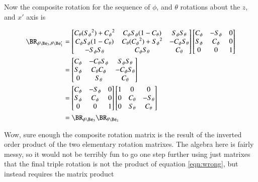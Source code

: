 \documentclass{article}
\begin{document}
Now the composite rotation for the sequence of $\phi$, and $\theta$ rotations about the $z$, and $x'$ axis is

\begin{align*}
\BR_{\phi \Be_3, \theta \Be_1'}
&=
\begin{bmatrix}
C_\theta({S_\phi}^2) + {C_\phi}^2 & {C_\phi} {S_\phi} (1-C_\theta) & {S_\phi} S_\theta \\
{C_\phi} {S_\phi} (1-C_\theta) & C_\theta({C_\phi}^2) + {S_\phi}^2 & - {C_\phi} S_\theta \\
- {S_\phi} S_\theta & {C_\phi} S_\theta & C_\theta \\
\end{bmatrix}
\begin{bmatrix}
C_\phi & - S_\phi & 0 \\
S_\phi & C_\phi & 0 \\
0 & 0 & 1 \\
\end{bmatrix} \\
&=
\begin{bmatrix}
C_\phi & -C_\theta S_\phi & {S_\phi} S_\theta \\
S_\phi & C_\theta C_\phi & - {C_\phi} S_\theta \\
0 & S_\theta & C_\theta \\
\end{bmatrix} \\
&=
\begin{bmatrix}
C_\phi & - S_\phi & 0 \\
S_\phi & C_\phi & 0 \\
0 & 0 & 1 \\
\end{bmatrix}
\begin{bmatrix}
1 & 0 & 0 \\
0 & C_\theta & - S_\theta \\
0 & S_\theta & C_\theta \\
\end{bmatrix} \\
&=
\BR_{\phi \Be_3} 
\BR_{\theta \Be_1} \\
\end{align*}

Wow, sure enough the composite rotation matrix is the result of the inverted order product of the two elementary rotation matrixes.  The
algebra here is fairly messy, so it would not be terribly fun to go one step further using just matrixes that the final triple rotation
is not the product of equation \ref{eqn:wrong}, but instead 
requires
the matrix product
\end{document}
